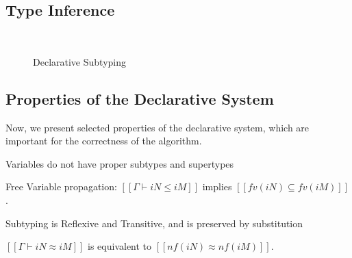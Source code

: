 \subsection{Type Inference}


\begin{figure}[h]
  \ottdefnDTNInf{}

  \hfill

  \begin{multicols}{2}
  \ottdefnDTPInf{}
  \\
  \ottdefnDTSpinInf{}
  \end{multicols}
  \hfill

  \caption{Declarative Subtyping}
  \label{fig:declarative-inference}
\end{figure}

\subsection{Properties of the Declarative System}

Now, we present selected properties of the declarative system,
which are important for the correctness of the algorithm.

\begin{lemma}
  Variables do not have proper subtypes and supertypes
\end{lemma}

\begin{lemma}
  Free Variable propagation: $[[Γ ⊢ iN ≤ iM]]$ 
  implies $[[fv(iN) ⊆ fv(iM)]]$.
\end{lemma}

\begin{lemma}
  Subtyping is Reflexive and Transitive, and is preserved by substitution
\end{lemma}

\begin{lemma}
  $[[Γ ⊢ iN ≈ iM]]$ is equivalent to $[[nf(iN) ≈ nf(iM)]]$.
\end{lemma}

\begin{lemma}
\end{lemma}